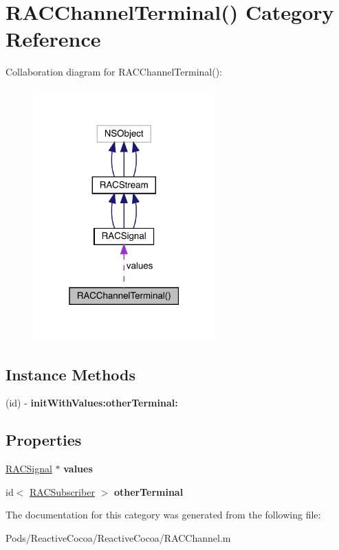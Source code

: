 \hypertarget{category_r_a_c_channel_terminal_07_08}{}\section{R\+A\+C\+Channel\+Terminal() Category Reference}
\label{category_r_a_c_channel_terminal_07_08}


Collaboration diagram for R\+A\+C\+Channel\+Terminal()\+:\nopagebreak
\begin{figure}[H]
\begin{center}
\leavevmode
\includegraphics[width=199pt]{category_r_a_c_channel_terminal_07_08__coll__graph}
\end{center}
\end{figure}
\subsection*{Instance Methods}
\begin{DoxyCompactItemize}
\item 
\mbox{\label{category_r_a_c_channel_terminal_07_08_a021f2b1696509b9c8a356e21899e61d9}} 
(id) -\/ {\bfseries init\+With\+Values\+:other\+Terminal\+:}
\end{DoxyCompactItemize}
\subsection*{Properties}
\begin{DoxyCompactItemize}
\item 
\mbox{\label{category_r_a_c_channel_terminal_07_08_aa9395f3341e49a348203f1b8883e1e9f}} 
\mbox{\hyperlink{interface_r_a_c_signal}{R\+A\+C\+Signal}} $\ast$ {\bfseries values}
\item 
\mbox{\label{category_r_a_c_channel_terminal_07_08_aa665fa15ba30ada2ff1bd3853243def0}} 
id$<$ \mbox{\hyperlink{interface_r_a_c_subscriber}{R\+A\+C\+Subscriber}} $>$ {\bfseries other\+Terminal}
\end{DoxyCompactItemize}


The documentation for this category was generated from the following file\+:\begin{DoxyCompactItemize}
\item 
Pods/\+Reactive\+Cocoa/\+Reactive\+Cocoa/R\+A\+C\+Channel.\+m\end{DoxyCompactItemize}
